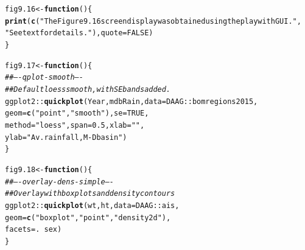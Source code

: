 \documentclass[12pt, a4paper,  BCOR=8.25mm, DIV=15]{scrartcl}\usepackage[]{graphicx}\usepackage[]{color}
\makeatletter
\newcommand{\hlnum}[1]{\textcolor[rgb]{0.686,0.059,0.569}{#1}}%
\newcommand{\hlstr}[1]{\textcolor[rgb]{0.192,0.494,0.8}{#1}}%
\newcommand{\hlcom}[1]{\textcolor[rgb]{0.678,0.584,0.686}{\textit{#1}}}%
\newcommand{\hlopt}[1]{\textcolor[rgb]{0,0,0}{#1}}%
\newcommand{\hlstd}[1]{\textcolor[rgb]{0.345,0.345,0.345}{#1}}%
\newcommand{\hlkwa}[1]{\textcolor[rgb]{0.161,0.373,0.58}{\textbf{#1}}}%
\newcommand{\hlkwb}[1]{\textcolor[rgb]{0.69,0.353,0.396}{#1}}%
\newcommand{\hlkwc}[1]{\textcolor[rgb]{0.333,0.667,0.333}{#1}}%
\newcommand{\hlkwd}[1]{\textcolor[rgb]{0.737,0.353,0.396}{\textbf{#1}}}%
\newenvironment{kframe}{%
 \def\at@end@of@kframe{}%
 \ifinner\ifhmode%
  \def\at@end@of@kframe{\end{minipage}}%
  \begin{minipage}{\columnwidth}%
 \fi\fi%
 \def\FrameCommand##1{\hskip\@totalleftmargin \hskip-\fboxsep
 \colorbox{shadecolor}{##1}\hskip-\fboxsep
     \hskip-\linewidth \hskip-\@totalleftmargin \hskip\columnwidth}%
 \MakeFramed {\advance\hsize-\width
   \@totalleftmargin\z@ \linewidth\hsize
   \@setminipage}}%
 {\par\unskip\endMakeFramed%
 \at@end@of@kframe}
\newenvironment{knitrout}{}{} %
\makeatother
\begin{document}
\begin{knitrout}
\color{fgcolor}\begin{kframe}
\begin{alltt}
\hlstd{fig9.16} \hlkwb{<-} \hlkwa{function}\hlstd{()\{}
\hlkwd{print}\hlstd{(}\hlkwd{c}\hlstd{(}\hlstr{"The Figure 9.16 screen display was obtained using the playwith GUI."}\hlstd{,}
        \hlstr{"See text for details."}\hlstd{),} \hlkwc{quote}\hlstd{=}\hlnum{FALSE}\hlstd{)}
\hlstd{\}}
\end{alltt}
\end{kframe}
\end{knitrout}

\begin{knitrout}
\color{fgcolor}\begin{kframe}
\begin{alltt}
\hlstd{fig9.17} \hlkwb{<-} \hlkwa{function}\hlstd{()\{}
\hlcom{## ---- qplot-smooth ----}
\hlcom{## Default loess smooth, with SE bands added.}
\hlstd{ggplot2}\hlopt{::}\hlkwd{quickplot}\hlstd{(Year, mdbRain,} \hlkwc{data}\hlstd{=DAAG}\hlopt{::}\hlstd{bomregions2015,}
          \hlkwc{geom}\hlstd{=}\hlkwd{c}\hlstd{(}\hlstr{"point"}\hlstd{,}\hlstr{"smooth"}\hlstd{),} \hlkwc{se}\hlstd{=}\hlnum{TRUE}\hlstd{,}
          \hlkwc{method}\hlstd{=}\hlstr{"loess"}\hlstd{,} \hlkwc{span}\hlstd{=}\hlnum{0.5}\hlstd{,} \hlkwc{xlab}\hlstd{=}\hlstr{""}\hlstd{,}
          \hlkwc{ylab}\hlstd{=}\hlstr{"Av. rainfall, M-D basin"}\hlstd{)}
\hlstd{\}}
\end{alltt}
\end{kframe}
\end{knitrout}

\begin{knitrout}
\color{fgcolor}\begin{kframe}
\begin{alltt}
\hlstd{fig9.18} \hlkwb{<-} \hlkwa{function}\hlstd{()\{}
\hlcom{## ---- overlay-dens-simple ----}
\hlcom{## Overlay with boxplots and density contours}
\hlstd{ggplot2}\hlopt{::}\hlkwd{quickplot}\hlstd{(wt, ht,} \hlkwc{data}\hlstd{=DAAG}\hlopt{::}\hlstd{ais,}
          \hlkwc{geom}\hlstd{=}\hlkwd{c}\hlstd{(}\hlstr{"boxplot"}\hlstd{,} \hlstr{"point"}\hlstd{,} \hlstr{"density2d"}\hlstd{),}
          \hlkwc{facets} \hlstd{= .} \hlopt{~} \hlstd{sex)}
\hlstd{\}}
\end{alltt}
\end{kframe}
\end{knitrout}
\end{document}
